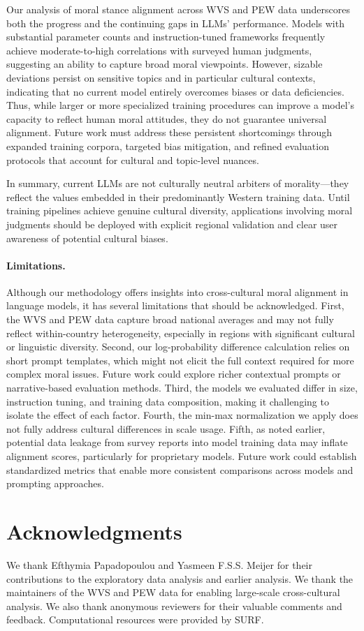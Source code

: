 \documentclass[a4paper,10pt,twoside]{article}
\begin{document}
Our analysis of moral stance alignment across WVS and PEW data underscores both the progress and the continuing gaps in LLMs' performance. Models with substantial parameter counts and instruction-tuned frameworks frequently achieve moderate-to-high correlations with surveyed human judgments, suggesting an ability to capture broad moral viewpoints. However, sizable deviations persist on sensitive topics and in particular cultural contexts, indicating that no current model entirely overcomes biases or data deficiencies. Thus, while larger or more specialized training procedures can improve a model's capacity to reflect human moral attitudes, they do not guarantee universal alignment. Future work must address these persistent shortcomings through expanded training corpora, targeted bias mitigation, and refined evaluation protocols that account for cultural and topic-level nuances.

In summary, current LLMs are not culturally neutral arbiters of morality---they reflect the values embedded in their predominantly Western training data. Until training pipelines achieve genuine cultural diversity, applications involving moral judgments should be deployed with explicit regional validation and clear user awareness of potential cultural biases.

\paragraph{Limitations.}
Although our methodology offers insights into cross-cultural moral alignment in language models, it has several limitations that should be acknowledged. First, the WVS and PEW data capture broad national averages and may not fully reflect within-country heterogeneity, especially in regions with significant cultural or linguistic diversity. Second, our log-probability difference calculation relies on short prompt templates, which might not elicit the full context required for more complex moral issues. Future work could explore richer contextual prompts or narrative-based evaluation methods. Third, the models we evaluated differ in size, instruction tuning, and training data composition, making it challenging to isolate the effect of each factor. Fourth, the min-max normalization we apply does not fully address cultural differences in scale usage. Fifth, as noted earlier, potential data leakage from survey reports into model training data may inflate alignment scores, particularly for proprietary models. Future work could establish standardized metrics that enable more consistent comparisons across models and prompting approaches.


\section*{Acknowledgments}

We thank Efthymia Papadopoulou and Yasmeen F.S.S. Meijer for their contributions to the exploratory data analysis and earlier analysis. We thank the maintainers of the WVS and PEW data for enabling large-scale cross-cultural analysis. We also thank anonymous reviewers for their valuable comments and feedback. Computational resources were provided by SURF.



\end{document}
